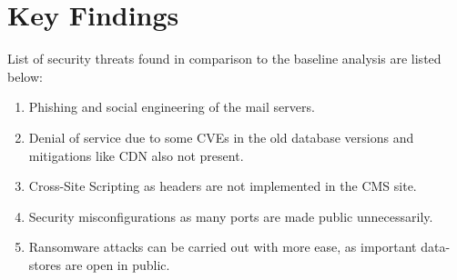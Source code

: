 \newpage
\section{Key Findings}

List of security threats found in comparison to the baseline analysis are listed below:

\begin{enumerate}
    \item Phishing and social engineering of the mail servers.
    \item Denial of service due to some CVEs in the old database versions and mitigations like CDN also not present.
    \item Cross-Site Scripting as headers are not implemented in the CMS site.
    \item Security misconfigurations as many ports are made public unnecessarily.
    \item Ransomware attacks can be carried out with more ease, as important data-stores are open in public.
\end{enumerate}

